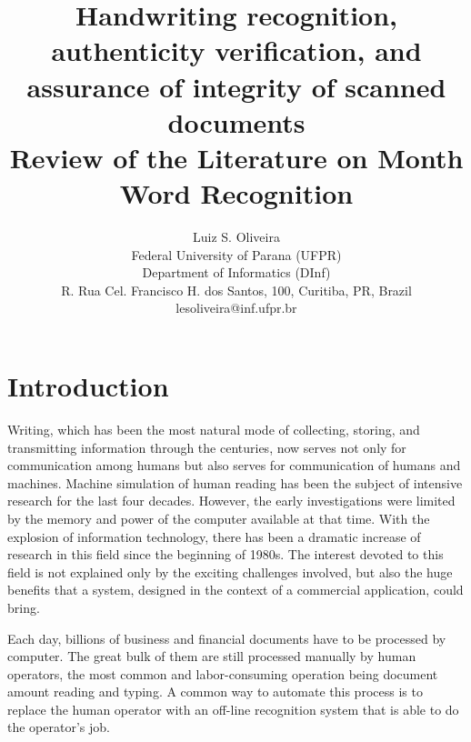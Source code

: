 \documentclass{article}[14pt, oneside, a4paper, times]
\begin{document}
\title{Handwriting recognition, authenticity verification, and assurance of integrity of scanned documents 
\\ \large Review of the Literature on Month Word Recognition}
\author{Luiz S. Oliveira  
\\
\vspace {-10pt}
Federal University of Parana (UFPR)\\
\vspace {-10pt}
Department of Informatics (DInf)\\
\vspace {-10pt}
R. Rua Cel. Francisco H. dos Santos, 100, Curitiba, PR, Brazil \\
lesoliveira@inf.ufpr.br \\ 
}


\date{}
\maketitle
\thispagestyle{empty}





\section{Introduction} 

Writing, which has been the most natural mode of collecting, storing, and transmitting information through the centuries, now serves not only for communication among humans but also serves for communication of humans and machines. Machine simulation of human reading has been the subject of intensive research for the last four decades. However, the early investigations were limited by the memory and power of the computer available at that time. With the explosion of information technology, there has been a dramatic increase of research in this field since the beginning of 1980s. The interest devoted to this field is not explained only by the exciting challenges involved, but also the huge benefits that a system, designed in the context of a commercial application, could bring.

Each day, billions of business and financial documents have to be processed by computer. The great bulk of them are still processed manually by human operators, the most common and labor-consuming operation being document amount reading and typing. A common way to automate this process is to replace the human operator with an off-line recognition system that is able to do the operator's job.
\end{document}
